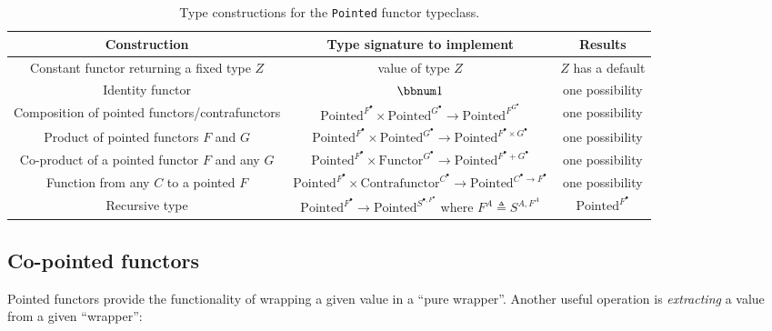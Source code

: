 \begin{table}
\begin{centering}
\begin{tabular}{|c|c|c|}
\hline 
\textbf{\footnotesize{}Construction} & \textbf{\footnotesize{}Type signature to implement} & \textbf{\footnotesize{}Results}\tabularnewline
\hline 
\hline 
{\footnotesize{}Constant functor returning a fixed type $Z$} & {\footnotesize{}value of type $Z$} & {\footnotesize{}$Z$ has a default}\tabularnewline
\hline 
{\footnotesize{}Identity functor} & {\footnotesize{}$\bbnum 1$} & {\footnotesize{}one possibility}\tabularnewline
\hline 
{\footnotesize{}Composition of pointed functors/contrafunctors} & {\footnotesize{}$\text{Pointed}^{F^{\bullet}}\times\text{Pointed}^{G^{\bullet}}\rightarrow\text{Pointed}^{F^{G^{\bullet}}}$} & {\footnotesize{}one possibility}\tabularnewline
\hline 
{\footnotesize{}Product of pointed functors $F$ and $G$} & {\footnotesize{}$\text{Pointed}^{F^{\bullet}}\times\text{Pointed}^{G^{\bullet}}\rightarrow\text{Pointed}^{F^{\bullet}\times G^{\bullet}}$} & {\footnotesize{}one possibility}\tabularnewline
\hline 
{\footnotesize{}Co-product of a pointed functor $F$ and any $G$} & {\footnotesize{}$\text{Pointed}^{F^{\bullet}}\times\text{Functor}^{G^{\bullet}}\rightarrow\text{Pointed}^{F^{\bullet}+G^{\bullet}}$} & {\footnotesize{}one possibility}\tabularnewline
\hline 
{\footnotesize{}Function from any $C$ to a pointed $F$} & {\footnotesize{}$\text{Pointed}^{F^{\bullet}}\times\text{Contrafunctor}^{C^{\bullet}}\rightarrow\text{Pointed}^{C^{\bullet}\rightarrow F^{\bullet}}$} & {\footnotesize{}one possibility}\tabularnewline
\hline 
{\footnotesize{}Recursive type} & {\footnotesize{}$\text{Pointed}^{F^{\bullet}}\rightarrow\text{Pointed}^{S^{\bullet,F^{\bullet}}}$
where $F^{A}\triangleq S^{A,F^{A}}$} & {\footnotesize{}$\text{Pointed}^{F^{\bullet}}$}\tabularnewline
\hline 
\end{tabular}
\par\end{centering}
\caption{Type constructions for the \lstinline!Pointed! functor typeclass.\label{tab:Type-constructions-for-pointed-functor}}
\end{table}


\subsection{Co-pointed functors}

Pointed functors provide the functionality of wrapping a given value
in a ``pure wrapper''. Another useful operation is \emph{extracting}
a value from a given ``wrapper'':

